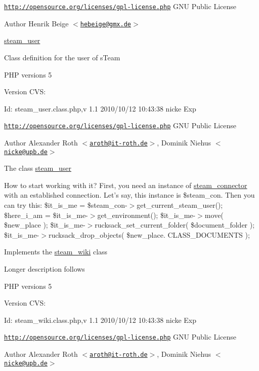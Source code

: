 \href{http://opensource.org/licenses/gpl-license.php}{\tt http://opensource.org/licenses/gpl-\/license.php} GNU Public License \begin{DoxyAuthor}{Author}
Henrik Beige $<$\href{mailto:hebeige@gmx.de}{\tt hebeige@gmx.de}$>$
\end{DoxyAuthor}
\hyperlink{classsteam__user}{steam\_\-user}

Class definition for the user of sTeam

PHP versions 5

\begin{DoxyVersion}{Version}
CVS: 
\end{DoxyVersion}
\begin{DoxyParagraph}{Id:}
steam\_\-user.class.php,v 1.1 2010/10/12 10:43:38 nicke Exp 
\end{DoxyParagraph}


\href{http://opensource.org/licenses/gpl-license.php}{\tt http://opensource.org/licenses/gpl-\/license.php} GNU Public License \begin{DoxyAuthor}{Author}
Alexander Roth $<$\href{mailto:aroth@it-roth.de}{\tt aroth@it-\/roth.de}$>$, Dominik Niehus $<$\href{mailto:nicke@upb.de}{\tt nicke@upb.de}$>$
\end{DoxyAuthor}
The class \hyperlink{classsteam__user}{steam\_\-user}

How to start working with it? First, you need an instance of \hyperlink{classsteam__connector}{steam\_\-connector} with an established connection. Let's say, this instance is \$steam\_\-con. Then you can try this: {\ttfamily  \$it\_\-is\_\-me = \$steam\_\-con-\/$>$get\_\-current\_\-steam\_\-user(); \$here\_\-i\_\-am = \$it\_\-is\_\-me-\/$>$get\_\-environment(); \$it\_\-is\_\-me-\/$>$move( \$new\_\-place ); \$it\_\-is\_\-me-\/$>$rucksack\_\-set\_\-current\_\-folder( \$document\_\-folder ); \$it\_\-is\_\-me-\/$>$rucksack\_\-drop\_\-objects( \$new\_\-place. CLASS\_\-DOCUMENTS ); }

Implements the \hyperlink{classsteam__wiki}{steam\_\-wiki} class

Longer description follows

PHP versions 5 \begin{DoxyVersion}{Version}
CVS: 
\end{DoxyVersion}
\begin{DoxyParagraph}{Id:}
steam\_\-wiki.class.php,v 1.1 2010/10/12 10:43:38 nicke Exp 
\end{DoxyParagraph}


\href{http://opensource.org/licenses/gpl-license.php}{\tt http://opensource.org/licenses/gpl-\/license.php} GNU Public License \begin{DoxyAuthor}{Author}
Alexander Roth $<$\href{mailto:aroth@it-roth.de}{\tt aroth@it-\/roth.de}$>$, Dominik Niehus $<$\href{mailto:nicke@upb.de}{\tt nicke@upb.de}$>$ 
\end{DoxyAuthor}
